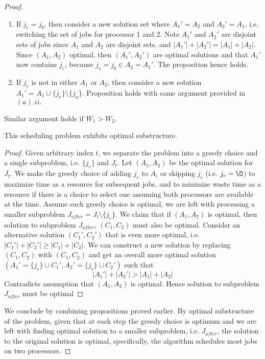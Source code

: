 \documentclass[11pt]{article}
\begin{document}
\begin{enumerate}
\begin{proof}
\begin{enumerate}
\begin{enumerate}
        \begin{enumerate}
          \item If $j_e = j_b$, then consider a new solution set where $A_1' = A_2$ and $A_2' = A_1$, i.e. switching the set of jobs for processor 1 and 2. Note $A_1'$ and $A_2'$ are disjoint sets of jobs since $A_1$ and $A_2$ are disjoint sets. and $|A_1'| + |A_2'| = |A_1| + |A_2|$. Since $(A_1, A_2)$ optimal, then $(A_1', A_2')$ are optimal solutions and that $A_1'$ now contains $j_e$, because $j_e = j_b \in A_2 = A_1'$. The proposition hence holds.
          \item If $j_e$ is not in either $A_1$ or $A_2$, then consider a new solution $A_1' = A_1 \cup \{ j_e\} \setminus \{ j_a \}$. Proposition holds with same argument provided in $(a). ii.$
        \end{enumerate}
      \end{enumerate}
      Similar argument holds if $W_1 > W_2$.
    \end{enumerate}


    \begin{proposition*}
      This scheduling problem exhibits optimal substructure.
    \end{proposition*}
    \begin{proof}
      Given arbitrary index $t$, we separate the problem into a greedy choice and a single subproblem, i.e. $\{ j_e \}$ and $J_t$. Let $(A_1, A_2)$ be the optimal solution for $J_t$. We make the greedy choice of adding $j_e$ to $A_i$ or skipping $j_e$ (i.e. $j_e = \O$) to maximize time as a resource for subsequent jobs, and to minimize waste time as a resource if there is a choice to select one assuming both processors are available at the time. Assume such greedy choice is optimal, we are left with processing a smaller subproblem $J_{after} = J_t \setminus \{ j_e \}$. We claim that if $(A_1, A_2)$ is optimal, then solution to subproblem $J_{after}$, $(C_1, C_2)$ must also be optimal. Consider an alternative solution $(C_1', C_2')$ that is even more optimal, i.e. $|C_1'| + |C_2'| \geq |C_1| + |C_2|$. We can construct a new solution by replacing $(C_1, C_2)$ with $(C_1, C_2)$ and get an overall more optimal solution $(A_1' = \{ j_e \} \cup C_1', A_2' = \{ j_e \}\cup C_2')$ such that
      \[
        |A_1'| + |A_2'| > |A_1| + |A_2|
      \]
      Contradicts assumption that $(A_1, A_2)$ is optimal. Hence solution to subproblem $J_{after}$ must be optimal
    \end{proof}

    We conclude by combining propositions proved earlier. By optimal substructure of the problem, given that at each step the greedy choice is optimum and we are left with finding optimal solution to a smaller subproblem, i.e. $J_{after}$, the solution to the original solution is optimal, specifically, the algorithm schedules most jobs on two processors.
  \end{proof}


\end{enumerate}
\end{document}
